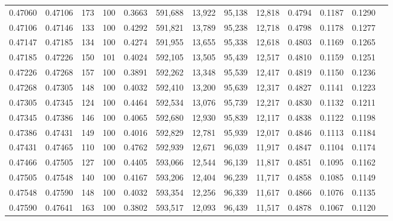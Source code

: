 \begin{tabular}{rrrrrrrrrrrrr}
0.47060 & 0.47106 &   173 & 100 &                                     0.3663 & 591,688 &  13,922 &  95,138 &  12,818 & 0.4794 & 0.1187 & 0.1290 \\
0.47106 & 0.47146 &   133 & 100 &                                     0.4292 & 591,821 &  13,789 &  95,238 &  12,718 & 0.4798 & 0.1178 & 0.1277 \\
0.47147 & 0.47185 &   134 & 100 &                                     0.4274 & 591,955 &  13,655 &  95,338 &  12,618 & 0.4803 & 0.1169 & 0.1265 \\
0.47185 & 0.47226 &   150 & 101 &                                     0.4024 & 592,105 &  13,505 &  95,439 &  12,517 & 0.4810 & 0.1159 & 0.1251 \\
0.47226 & 0.47268 &   157 & 100 &                                     0.3891 & 592,262 &  13,348 &  95,539 &  12,417 & 0.4819 & 0.1150 & 0.1236 \\
0.47268 & 0.47305 &   148 & 100 &                                     0.4032 & 592,410 &  13,200 &  95,639 &  12,317 & 0.4827 & 0.1141 & 0.1223 \\
0.47305 & 0.47345 &   124 & 100 &                                     0.4464 & 592,534 &  13,076 &  95,739 &  12,217 & 0.4830 & 0.1132 & 0.1211 \\
0.47345 & 0.47386 &   146 & 100 &                                     0.4065 & 592,680 &  12,930 &  95,839 &  12,117 & 0.4838 & 0.1122 & 0.1198 \\
0.47386 & 0.47431 &   149 & 100 &                                     0.4016 & 592,829 &  12,781 &  95,939 &  12,017 & 0.4846 & 0.1113 & 0.1184 \\
0.47431 & 0.47465 &   110 & 100 &                                     0.4762 & 592,939 &  12,671 &  96,039 &  11,917 & 0.4847 & 0.1104 & 0.1174 \\
0.47466 & 0.47505 &   127 & 100 &                                     0.4405 & 593,066 &  12,544 &  96,139 &  11,817 & 0.4851 & 0.1095 & 0.1162 \\
0.47505 & 0.47548 &   140 & 100 &                                     0.4167 & 593,206 &  12,404 &  96,239 &  11,717 & 0.4858 & 0.1085 & 0.1149 \\
0.47548 & 0.47590 &   148 & 100 &                                     0.4032 & 593,354 &  12,256 &  96,339 &  11,617 & 0.4866 & 0.1076 & 0.1135 \\
0.47590 & 0.47641 &   163 & 100 &                                     0.3802 & 593,517 &  12,093 &  96,439 &  11,517 & 0.4878 & 0.1067 & 0.1120 \\

\end{tabular}
